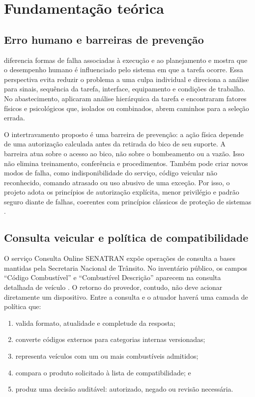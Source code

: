 \section{Fundamentação teórica}
\label{sec:fundamentacao}

\subsection{Erro humano e barreiras de prevenção}

\cite{reason1990} diferencia formas de falha associadas à execução e ao
planejamento e mostra que o desempenho humano é influenciado pelo sistema em
que a tarefa ocorre. Essa perspectiva evita reduzir o problema a uma culpa
individual e direciona a análise para sinais, sequência da tarefa, interface,
equipamento e condições de trabalho. No abastecimento, \cite{adamsDavid2007}
aplicaram análise hierárquica da tarefa e encontraram fatores físicos e
psicológicos que, isolados ou combinados, abrem caminhos para a seleção errada.

O intertravamento proposto é uma barreira de prevenção: a ação física depende de
uma autorização calculada antes da retirada do bico de seu suporte. A barreira
atua sobre o acesso ao bico, não sobre o bombeamento ou a vazão. Isso não elimina
treinamento, conferência e procedimentos. Também pode criar novos modos de
falha, como indisponibilidade do serviço, código veicular não reconhecido,
comando atrasado ou uso abusivo de uma exceção. Por isso, o projeto adota os
princípios de autorização explícita, menor privilégio e padrão seguro diante de
falhas, coerentes com princípios clássicos de proteção de sistemas
\cite{saltzerSchroeder1975}.

\subsection{Consulta veicular e política de compatibilidade}

O serviço Consulta Online SENATRAN expõe operações de consulta a bases mantidas pela
Secretaria Nacional de Trânsito. No inventário público, os campos ``Código
Combustível'' e ``Combustível Descrição'' aparecem na consulta detalhada de
veículo \cite{serproDadosVeiculo2026}. O retorno do provedor, contudo, não deve
acionar diretamente um dispositivo. Entre a consulta e o atuador haverá uma
camada de política que:

\begin{enumerate}
  \item valida formato, atualidade e completude da resposta;
  \item converte códigos externos para categorias internas versionadas;
  \item representa veículos com um ou mais combustíveis admitidos;
  \item compara o produto solicitado à lista de compatibilidade; e
  \item produz uma decisão auditável: autorizado, negado ou revisão necessária.
\end{enumerate}

